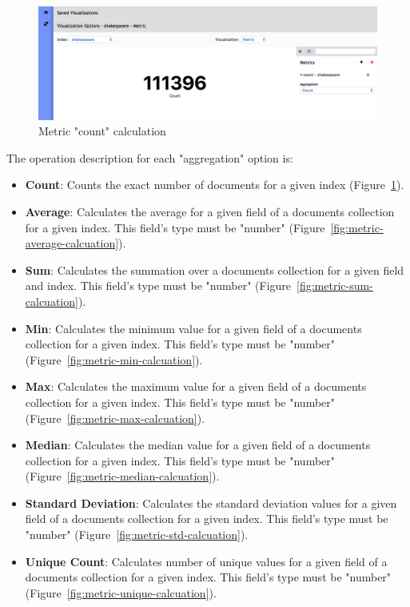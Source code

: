 \documentclass[a4paper, 12pt, english]{book}
\begin{document}
\begin{figure}
  \centering
  \includegraphics[width=13cm, keepaspectratio]{img/metric-count-calcuation.png}
  \caption{Metric "count" calculation}
  \label{fig:metric-count-calcuation}
\end{figure}

The operation description for each "aggregation" option is:
\begin{itemize}
    \item \textbf{Count}: Counts the exact number of documents for a given index (Figure~\ref{fig:metric-count-calcuation}).
    \item \textbf{Average}: Calculates the average for a given field of a documents collection for a given index. This field's type must be "number" (Figure~\ref{fig:metric-average-calcuation}).
    \item \textbf{Sum}: Calculates the summation over a documents collection for a given field and index. This field's type must be "number" (Figure~\ref{fig:metric-sum-calcuation}).
    \item \textbf{Min}: Calculates the minimum value for a given field of a documents collection for a given index. This field's type must be "number" (Figure~\ref{fig:metric-min-calcuation}).
    \item \textbf{Max}: Calculates the maximum value for a given field of a documents collection for a given index. This field's type must be "number" (Figure~\ref{fig:metric-max-calcuation}).
    \item \textbf{Median}: Calculates the median value for a given field of a documents collection for a given index. This field's type must be "number" (Figure~\ref{fig:metric-median-calcuation}).
    \item \textbf{Standard Deviation}: Calculates the standard deviation values for a given field of a documents collection for a given index. This field's type must be "number" (Figure~\ref{fig:metric-std-calcuation}).
    \item \textbf{Unique Count}: Calculates number of unique values for a given field of a documents collection for a given index. This field's type must be "number" (Figure~\ref{fig:metric-unique-calcuation}).

\end{itemize}
\end{document}
